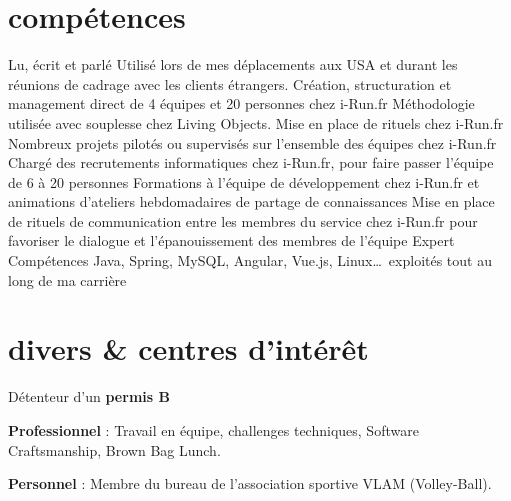 \documentclass{friggeri-cv} 	%
\begin{document}

\section{compétences}

\begin{capabilitize}
		{Lu, écrit et parlé}
		{Utilisé lors de mes déplacements aux USA et durant les réunions de cadrage avec les clients
		étrangers.}
		{}
		{Création, structuration et management direct de 4 équipes et 20 personnes chez i-Run.fr}
		{}
		{Méthodologie utilisée avec souplesse chez Living Objects. Mise en place de rituels chez i-Run.fr}
		{}
		{Nombreux projets pilotés ou supervisés sur l’ensemble des équipes chez i-Run.fr}
		{}
		{Chargé des recrutements informatiques chez i-Run.fr, pour faire passer l’équipe de 6 à 20 personnes}
        {}
        {Formations à l’équipe de développement chez i-Run.fr et animations d’ateliers hebdomadaires de partage de connaissances}
		{}
		{Mise en place de rituels de communication entre les membres du service chez i-Run.fr pour favoriser le dialogue 
        et l’épanouissement des membres de l’équipe}
		{Expert}
		{Compétences Java, Spring, MySQL, Angular, Vue.js, Linux\dots\ exploités tout au long de ma carrière}
\end{capabilitize}


\section{divers \& centres d’intérêt}

Détenteur d’un \textbf{permis B}

\textbf{Professionnel} : Travail en équipe, challenges techniques, Software Craftsmanship, Brown Bag Lunch.

\textbf{Personnel} : Membre du bureau de l’association sportive VLAM (Volley-Ball).
\end{document}

